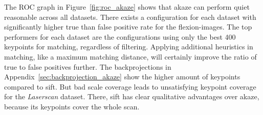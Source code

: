 The \acrshort{ROC} graph in Figure~\ref{fig:roc_akaze} shows that \acrshort{akaze} can perform quiet reasonable across all datasets.
There exists a configuration for each dataset with significantly higher true than false positive rate for the \glspl{flexion-image}.
The top performers for each dataset are the configurations using only the best 400 keypoints for matching, regardless of filtering.
Applying additional heuristics in matching, like a maximum matching distance, will certainly improve the ratio of true to false positives further.
The backprojections in Appendix~\ref{sec:backprojection_akaze} show the higher amount of keypoints compared to \acrshort{sift}.
But bad scale coverage leads to unsatisfying keypoint coverage for the \emph{Laserscan} dataset.
There, \acrshort{sift} has clear qualitative advantages over \acrshort{akaze}, because its keypoints cover the whole scan.
